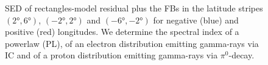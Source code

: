 \begin{figure}[h!]

  	\caption{SED of rectangles-model residual plus the FBs in the latitude stripes $(\ang{2}, \ang{6})$, $(\ang{-2}, \ang{2})$ and $(\ang{-6}, \ang{-2})$ for negative (blue) and positive (red) longitudes. We determine the spectral index of a powerlaw (PL), of an electron distribution emitting gamma-rays via IC and of a proton distribution emitting gamma-rays via $\pi^0$-decay.}
  	\label{fig:SED_with_fits}
\end{figure}

